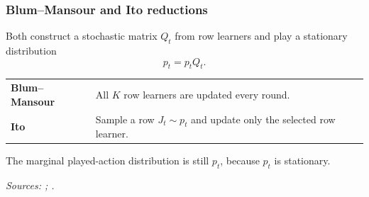 \begin{frame}[noframenumbering]
  \frametitle{Blum--Mansour and Ito reductions}

  \vspace{0.3cm}

  Both construct a stochastic matrix $Q_t$ from row learners and play a stationary distribution
  \[
    p_t = p_t Q_t.
  \]

  \vspace{0.2cm}

  \begin{tabularx}{\textwidth}{
    @{}
    >{\raggedright\arraybackslash}p{3.0cm}
    >{\raggedright\arraybackslash}X
    @{}
  }
    \textbf{Blum--Mansour} &
    All $K$ row learners are updated every round. \\[0.3cm]

    \textbf{Ito} &
    Sample a row $J_t\sim p_t$ and update only the selected row learner.
  \end{tabularx}

  \vspace{0.4cm}

  The marginal played-action distribution is still $p_t$, because $p_t$ is stationary.

  \vspace{0.5cm}
  {\scriptsize\color{black!60}
    {\itshape Sources: \citet{blum_external_2007}; \citet{ito_tight_2020}.}
  }
\end{frame}
